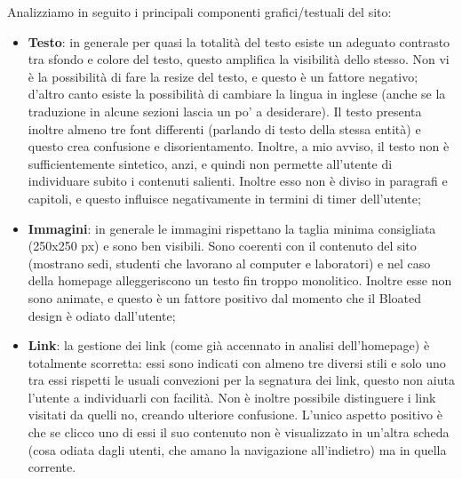 Analizziamo in seguito i principali componenti grafici/testuali del sito:
	\begin{itemize}
		\item \textbf{Testo}: in generale per quasi la totalità del testo esiste un adeguato contrasto tra sfondo e colore del testo, questo amplifica la visibilità dello stesso. Non vi è la possibilità di fare la resize del testo, e questo è un fattore negativo; d'altro canto esiste la possibilità di cambiare la lingua in inglese (anche se la traduzione in alcune sezioni lascia un po' a desiderare). Il testo presenta inoltre almeno tre font differenti (parlando di testo della stessa entità) e questo crea confusione e disorientamento. Inoltre, a mio avviso, il testo non è sufficientemente sintetico, anzi, e quindi non permette all'utente di individuare subito i contenuti salienti. Inoltre esso non è diviso in paragrafi e capitoli, e questo influisce negativamente in termini di timer dell'utente;
		\item \textbf{Immagini}: in generale le immagini rispettano la taglia minima consigliata (250x250 px) e sono ben visibili. Sono coerenti con il contenuto del sito (mostrano sedi, studenti che lavorano al computer e laboratori) e nel caso della homepage alleggeriscono un testo fin troppo monolitico. Inoltre esse non sono animate, e questo è un fattore positivo dal momento che il Bloated design è odiato dall'utente;
		\item \textbf{Link}: la gestione dei link (come già accennato in analisi dell'homepage) è totalmente scorretta: essi sono indicati con almeno tre diversi stili e solo uno tra essi rispetti le usuali convezioni per la segnatura dei link, questo non aiuta l'utente a individuarli con facilità. Non è inoltre possibile distinguere i link visitati da quelli no, creando ulteriore confusione. L'unico aspetto positivo è che se clicco uno di essi il suo contenuto non è visualizzato in un'altra scheda (cosa odiata dagli utenti, che amano la navigazione all'indietro) ma in quella corrente.
	\end{itemize}